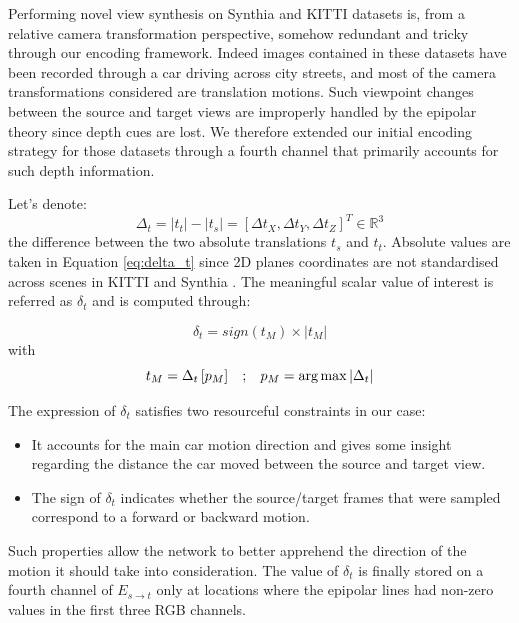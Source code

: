 Performing novel view synthesis on Synthia \citep{ros2016synthia} and KITTI \citep{geiger2012we} datasets is, from a relative camera transformation perspective, somehow redundant and tricky through our encoding framework. Indeed images contained in these datasets have been recorded through a car driving across city streets, and most of the camera transformations considered are translation motions. Such viewpoint changes between the source and target views are improperly handled by the epipolar theory since depth cues are lost. We therefore extended our initial encoding strategy for those datasets through a fourth channel that primarily accounts for such depth information.

Let's denote:
\begin{equation}
    \Delta_{t}= |t_{t}| - |t_{s}| = \left[\Delta t_{X},\Delta t_{Y},\Delta t_{Z} \right]^{T} \in \mathbb{R}^3
    \label{eq:delta_t}
\end{equation}
the difference between the two absolute translations $t_s$ and $t_t$. Absolute values are taken in Equation \ref{eq:delta_t} since 2D planes coordinates are not standardised across scenes in KITTI \citep{geiger2012we} and Synthia \citep{ros2016synthia}. The meaningful scalar value of interest is referred as $\delta_{t}$ and is computed through:
 
 \begin{equation}
 \label{eq:2}
     \delta_{t} = sign(t_{M}) \times| t_{M} |
 \end{equation}
 with \newline
 \begin{equation}t_{M} = \Delta_{t}\left[p_{M}\right] \hspace{.3cm} ;  \hspace{.3cm} p_{M}=\argmax |\Delta_{t}|\end{equation}

The expression of $\delta_{t}$ satisfies two resourceful constraints in our case: 

\begin{itemize}
    \item It accounts for the main car motion direction and gives some insight regarding the distance the car moved between the source and target view.
    \item The sign of $\delta_{t}$ indicates whether the source/target frames that were sampled correspond to a forward or backward motion. 
\end{itemize}
Such properties allow the network to better apprehend the direction of the motion it should take into consideration. The value of  $\delta_{t}$ is finally stored on a fourth channel of $E_{s\xrightarrow{}t}$ only at locations where the epipolar lines had non-zero values in the first three RGB channels. 

